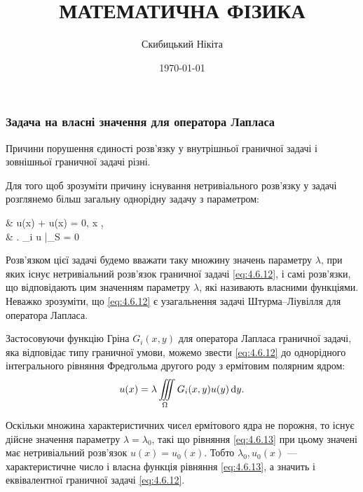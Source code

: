 

\title{{\Huge МАТЕМАТИЧНА ФІЗИКА}}
\author{Скибицький Нікіта}
\date{\today}





\tableofcontents

\setcounter{section}{4}
\setcounter{subsection}{6}
\setcounter{subsubsection}{0}
\setcounter{equation}{11}

\subsubsection{Задача на власні значення для оператора Лапласа}

Причини порушення єдиності розв'язку у внутрішньої граничної задачі  і зовнішньої граничної задачі  різні. \medskip

Для того щоб зрозуміти причину існування нетривіального розв'язку у задачі  розглянемо більш загальну однорідну задачу з параметром:
\begin{system}
	\label{eq:4.6.12}
	& \Delta u(x) + \lambda u(x) = 0, \quad x \in \Omega, \\
	& \left. \ell_i u \right|_S = 0
\end{system}

Розв'язком цієї задачі будемо вважати таку множину значень параметру $\lambda$, при яких існує нетривіальний розв'язок граничної задачі \eqref{eq:4.6.12}, і самі розв'язки, що відповідають цим значенням параметру $\lambda$, які називають власними функціями. Неважко зрозуміти, що \eqref{eq:4.6.12} є узагальнення задачі Штурма--Ліувілля для оператора Лапласа. \medskip

Застосовуючи функцію Гріна $G_i(x, y)$ для оператора Лапласа граничної задачі, яка відповідає типу граничної умови, можемо звести \eqref{eq:4.6.12} до однорідного інтегрального рівняння Фредгольма другого роду з ермітовим полярним ядром:
\begin{equation}
	\label{eq:4.6.13}
	u(x) = \lambda \displaystyle\iiint\limits_\Omega G_i(x, y) u(y) \mathop{}\!\mathrm{d} y.
\end{equation}

Оскільки множина характеристичних чисел ермітового ядра не порожня, то існує дійсне значення параметру $\lambda = \lambda_0$, такі що рівняння \eqref{eq:4.6.13} при цьому значені має нетривіальний розв'язок $u(x) = u_0(x)$. Тобто $\lambda_0, u_0(x)$ --- характеристичне число і власна функція рівняння \eqref{eq:4.6.13}, а значить і еквівалентної граничної задачі \eqref{eq:4.6.12}. \medskip

